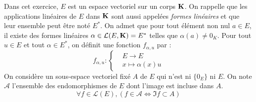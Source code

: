 Dans cet exercice, $E$ est un espace vectoriel sur un corps $\mathbf{K}$.
On rappelle que les applications linéaires de $E$ dans $\mathbf{K}$ sont aussi appelées \emph{formes linéaires} et que leur ensemble peut être noté $E^*$. \newline 
On admet que pour tout élément non nul $a\in E$, il existe des formes linéaires $\alpha \in \mathcal{L}(E,\mathbf{K})=E^*$ telles que $\alpha(a)\neq 0_K$.\newline
Pour tout $u\in E$ et tout $\alpha\in E^*$, on définit une fonction $f_{\alpha, u}$ par :
\begin{displaymath}
 f_{\alpha, u} :
\left\lbrace 
\begin{aligned}
 &E\rightarrow E\\ &x \mapsto \alpha(x)u
\end{aligned}
\right. 
\end{displaymath}
On considère un sous-espace vectoriel fixé $A$ de $E$ qui n'est ni $\{0_E\}$ ni $E$. On note $\mathcal{A}$ l'ensemble des endomorphismes de $E$ dont l'image est incluse dans $A$.
\begin{displaymath}
 \forall f\in\mathcal{L}(E), \left( f\in \mathcal{A} \Leftrightarrow \Im f \subset A\right) 
\end{displaymath}

